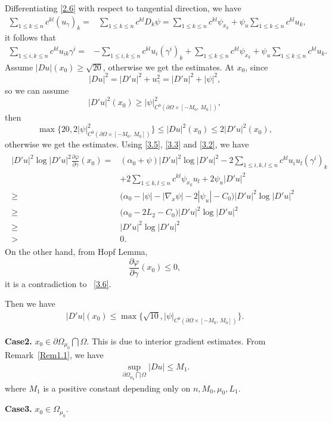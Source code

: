 \documentclass[11pt]{amsart}
\numberwithin{equation}{section}
\begin{document}
Differentiating \eqref{2.6} with respect to tangential direction,   we have
\begin{align}\label{3.4}
\sum_{1\leq k\leq n}c^{kl}(u_{\gamma})_k=&\sum_{1\leq k\leq n}c^{kl}D_k\psi=\sum_{1\leq k\leq n}c^{kl}\psi_{x_k}+\psi_u\sum_{1\leq k\leq n}c^{kl}u_k,
\end{align}
it follows that
\begin{align}\label{3.5}
\sum_{1\leq i, k\leq n}c^{kl}u_{ik}\gamma^i=&-\sum_{1\leq i,k\leq n}c^{kl}u_i(\gamma^i)_k+\sum_{1\leq k\leq n}c^{kl}\psi_{x_k}+\psi_u\sum_{1\leq k\leq n}c^{kl}u_k.
\end{align}
Assume $|Du|(x_0)\ge \sqrt{20}$, otherwise we get the estimates. At $x_0$,  since
$$|Du|^2=|D'u|^2+u_\gamma^2=|D'u|^2+|\psi|^2,$$ so we can assume
$$|D'u|^2(x_0) \geq |\psi|^2_{C^0(\partial\Omega\times[-M_0,\, M_0])},$$
then $$\max\{20,2|\psi|^2_{C^0(\partial\Omega\times[-M_0,\, M_0])}\}\leq|Du|^2(x_0)\leq2|D'u|^2(x_0),$$
otherwise we get the estimates.
Using \eqref{3.5}, \eqref{3.3} and \eqref{3.2}, we have
\begin{align}\label{3.6}
\begin{split}
|D'u|^2\log |D'u|^2 \frac{\partial\varphi}{\partial\gamma}(x_0)
=&(\alpha_0+\psi )|D'u|^2\log |D'u|^2-2\sum_{1\leq i,k,l\leq n}c^{kl}u_iu_l(\gamma^i)_k\\&+2\sum_{1\leq k,l\leq n}c^{kl}\psi_{x_k}u_l+2\psi_u|D'u|^2\\
\geq &\big(\alpha_0-|\psi|-|\nabla_x\psi|-2|\psi_u|-C_0\big)|D'u|^2\log |D'u|^2\\
\geq &\big(\alpha_0-2L_2-C_0\big)|D'u|^2\log |D'u|^2\\
\geq &|D'u|^2\log |D'u|^2\\
>& 0.
\end{split}
\end{align}
On the other hand, from Hopf Lemma,
$$\frac{\partial\varphi}{\partial\gamma}(x_0)\leq 0,$$
it is a contradiction to ~\eqref{3.6}.

Then we have
\begin{align}\label{3.7}
|D'u|(x_0)\leq\max\{\sqrt{10}, |\psi|_{C^0(\partial\Omega\times[-M_0,\, M_0])}\}.
\end{align}

{\bf Case2.} $ x_0\in \partial\Omega_{\mu_{0}}\bigcap\Omega$. This is due to interior gradient estimates. From Remark~\ref{Rem1.1}, we have
 \begin{align}\label{3.8}
\sup_{\partial\Omega_{\mu_0}\bigcap\Omega}|Du|\leq M_1.
\end{align}
where $M_1$ is a positive constant depending only on $n, M_0, \mu_0, L_1$.\par
{\bf Case3.} $x_0\in\Omega_{\mu_{0}}$. \par
\end{document}
